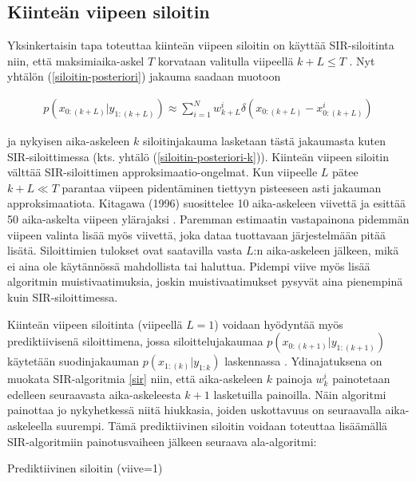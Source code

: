 \documentclass[
  12pt,
  a4paper, twoside]{book}
\begin{document}
\subsection{Kiinteän viipeen siloitin}

Yksinkertaisin tapa toteuttaa kiinteän viipeen siloitin on käyttää SIR-siloitinta niin, että maksimiaika-askel \(T\) korvataan valitulla viipeellä \(k+L \le T\) \citep{kitagawa-1996}. Nyt yhtälön (\ref{siloitin-posteriori}) jakauma saadaan muotoon

\begin{align}\label{siloitin-posteriori-viive}
p(x_{0:(k+L)}|y_{1:(k+L)}) \approx \sum_{i=1}^N w_{k+L}^i \delta (x_{0:(k+L)}-x_{0:(k+L)}^i)
\end{align}

\noindent ja nykyisen aika-askeleen \(k\) siloitinjakauma lasketaan tästä jakaumasta kuten SIR-siloittimessa (kts. yhtälö (\ref{siloitin-posteriori-k})). Kiinteän viipeen siloitin välttää SIR-siloittimen approksimaatio-ongelmat. Kun viipeelle \(L\) pätee \(k+L \ll T\) parantaa viipeen pidentäminen tiettyyn pisteeseen asti jakauman approksimaatiota. Kitagawa (1996) suosittelee 10 aika-askeleen viivettä ja esittää 50 aika-askelta viipeen ylärajaksi \citep{kitagawa-1996}. Paremman estimaatin vastapainona pidemmän viipeen valinta lisää myös viivettä, joka dataa tuottavaan järjestelmään pitää lisätä. Siloittimien tulokset ovat saatavilla vasta \(L\):n aika-askeleen jälkeen, mikä ei aina ole käytännössä mahdollista tai haluttua. Pidempi viive myös lisää algoritmin muistivaatimuksia, joskin muistivaatimukset pysyvät aina pienempinä kuin SIR-siloittimessa.

Kiinteän viipeen siloitinta (viipeellä \(L=1\)) voidaan hyödyntää myös prediktiivisenä siloittimena, jossa siloittelujakaumaa \(p(x_{0:(k+1)}|y_{1:(k+1)})\) käytetään suodinjakauman \(p(x_{1:(k)}|y_{1:k})\) laskennassa \citep{Nyobe-2021}. Ydinajatuksena on muokata SIR-algoritmia \ref{sir} niin, että aika-askeleen \(k\) painoja \(w_k^i\) painotetaan edelleen seuraavasta aika-askeleesta \(k+1\) lasketuilla painoilla. Näin algoritmi painottaa jo nykyhetkessä niitä hiukkasia, joiden uskottavuus on seuraavalla aika-askeleella suurempi. Tämä prediktiivinen siloitin voidaan toteuttaa lisäämällä SIR-algoritmiin painotusvaiheen jälkeen seuraava ala-algoritmi:

\begin{algorithm}[H]
\label{prediktiivinen-siloitin}
\DontPrintSemicolon
\SetAlgoShortEnd
{}
\caption{Prediktiivinen siloitin (viive=1)}
\end{algorithm}
\end{document}
